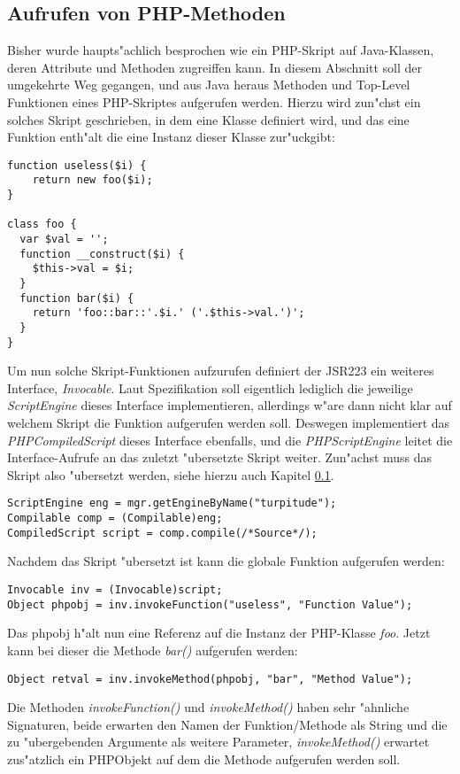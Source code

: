 \subsection{Aufrufen von PHP-Methoden}
\label{sec:app1:invoke}

Bisher wurde haupts"achlich besprochen wie ein PHP-Skript auf Java-Klassen, deren Attribute und
Methoden zugreiffen kann. In diesem Abschnitt soll der umgekehrte Weg gegangen, und aus Java heraus 
Methoden und Top-Level Funktionen eines PHP-Skriptes aufgerufen werden. Hierzu wird zun"chst
ein solches Skript geschrieben, in dem eine Klasse definiert wird, und das eine Funktion enth"alt die 
eine Instanz dieser Klasse zur"uckgibt:
\begin{lstlisting}[caption=PHP-Skript]
function useless($i) {
    return new foo($i);
}
 
class foo {
  var $val = '';
  function __construct($i) {
    $this->val = $i;
  }
  function bar($i) {
    return 'foo::bar::'.$i.' ('.$this->val.')';
  }
}
\end{lstlisting}
Um nun solche Skript-Funktionen aufzurufen definiert der JSR223 ein weiteres Interface, \emph{Invocable}.
Laut Spezifikation soll eigentlich lediglich die jeweilige \emph{ScriptEngine} dieses Interface implementieren,
allerdings w"are dann nicht klar auf welchem Skript die Funktion aufgerufen werden soll. Deswegen implementiert
das \emph{PHPCompiledScript} dieses Interface ebenfalls, und die \emph{PHPScriptEngine} leitet die Interface-Aufrufe
an das zuletzt "ubersetzte Skript weiter. Zun"achst muss das Skript also "ubersetzt werden, siehe hierzu auch
Kapitel \ref{sec:app1:invoke}.
\begin{lstlisting}[caption="Ubersetzen]
ScriptEngine eng = mgr.getEngineByName("turpitude");
Compilable comp = (Compilable)eng;
CompiledScript script = comp.compile(/*Source*/);
\end{lstlisting}
Nachdem das Skript "ubersetzt ist kann die globale Funktion aufgerufen werden:
\begin{lstlisting}[caption=Funktionsaufruf]
Invocable inv = (Invocable)script;
Object phpobj = inv.invokeFunction("useless", "Function Value");
\end{lstlisting}
Das phpobj h"alt nun eine Referenz auf die Instanz der PHP-Klasse \emph{foo}. Jetzt kann bei dieser
die Methode \emph{bar()} aufgerufen werden:
\begin{lstlisting}[caption=Methodenaufruf]
Object retval = inv.invokeMethod(phpobj, "bar", "Method Value");
\end{lstlisting}
Die Methoden \emph{invokeFunction()} und \emph{invokeMethod()} haben sehr "ahnliche Signaturen, beide
erwarten den Namen der Funktion/Methode als String und die zu "ubergebenden Argumente als weitere Parameter,
\emph{invokeMethod()} erwartet zus"atzlich ein PHPObjekt auf dem die Methode aufgerufen werden soll.

